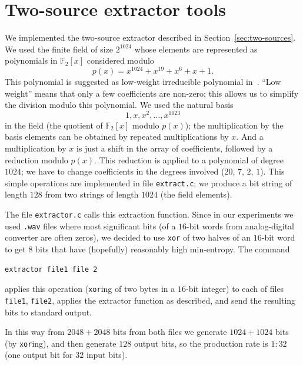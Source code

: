 \documentclass[12pt,a4paper,fullpage]{article}
\begin{document}
\section{Two-source extractor tools}\label{sec:2-extractor}

We implemented the two-source extractor described in Section~\ref{sec:two-sources}. We used the finite field of size $2^{1024}$ whose elements are represented as polynomials in $\mathbb{F}_2[x]$ considered modulo
\[
p(x)=x^{1024}+x^{19}+x^{6}+x+1.
\]
This polynomial is suggested as low-weight irreducible polynomial in~\cite{fields}. ``Low weight'' means that only a few coefficients are non-zero; this allows us to simplify the division modulo this polynomial.  We used the natural basis 
\[
1, x, x^2,\ldots, x^{1023}
\]
in the field (the quotient of $\mathbb{F}_2[x]$ modulo $p(x)$); the multiplication by the basis elements can be obtained by repeated multiplications by $x$. And a multiplication by $x$ is just a shift in the array of coefficients, followed by a reduction modulo $p(x)$. This reduction is applied to a polynomial of degree $1024$; we have to change coefficients in the degrees involved ($20$, $7$, $2$, $1$). This simple operations are implemented in file \texttt{extract.c}; we produce a bit string of length $128$ from two strings of length $1024$ (the field elements).

The file \texttt{extractor.c} calls this extraction function. Since in our experiments we used \texttt{.wav} files where most significant bits (of a $16$-bit words from analog-digital converter are often zeros), we decided to use \texttt{xor} of two halves of an $16$-bit word to get $8$ bits that have (hopefully) reasonably high min-entropy. The command 
\begin{verbatim}
extractor file1 file 2
\end{verbatim} 
applies this operation (\texttt{xor}ing of two bytes in a $16$-bit integer) to each of files \texttt{file1}, \texttt{file2}, applies the extractor function as described, and send the resulting bits to standard output. 

In this way from $2048+2048$ bits from both files we generate $1024+1024$ bits (by \texttt{xor}ing), and then generate $128$ output bits, so the production rate is $1:32$ (one output bit for $32$ input bits).
\end{document}
